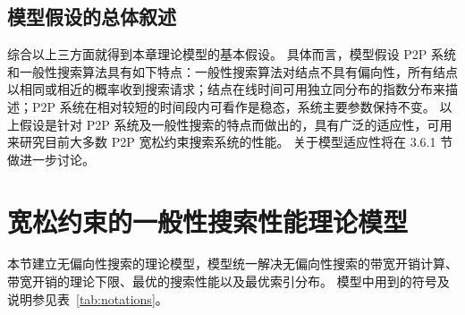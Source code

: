 \documentclass[degree=doctor]{thuthesis}
\begin{document}
\subsection{模型假设的总体叙述}

综合以上三方面就得到本章理论模型的基本假设。
具体而言，模型假设 P2P 系统和一般性搜索算法具有如下特点：一般性搜索算法对结点不具有偏向性，所有结点以相同或相近的概率收到搜索请求；结点在线时间可用独立同分布的指数分布来描述；P2P 系统在相对较短的时间段内可看作是稳态，系统主要参数保持不变。
以上假设是针对 P2P 系统及一般性搜索的特点而做出的，具有广泛的适应性，可用来研究目前大多数 P2P 宽松约束搜索系统的性能。
关于模型适应性将在 3.6.1 节做进一步讨论。


\section{宽松约束的一般性搜索性能理论模型}

本节建立无偏向性搜索的理论模型，模型统一解决无偏向性搜索的带宽开销计算、带宽开销的理论下限、最优的搜索性能以及最优索引分布。
模型中用到的符号及说明参见表~\ref{tab:notations}。

\newcommand\BWsearch{\mathit{BW}_{\text{search}}}
\newcommand\BWmaintain{\mathit{BW}_{\text{maintain}}}
\newcommand\BWtotal{\mathit{BW}_{\text{total}}}
\newcommand\bwpeer{\mathit{bw}_{\text{peer}}}
\end{document}
